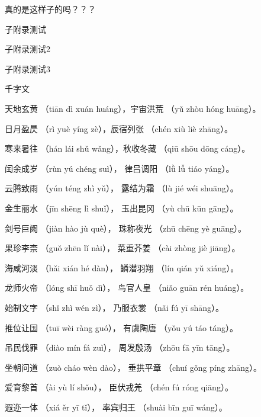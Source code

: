 \documentclass[12pt]{article}%
\begin{document}
\newpage
\begin{appendices}
真的是这样子的吗？？？
\begin{subappendix}
子附录测试





\end{subappendix}

\begin{subappendix}
子附录测试2
\end{subappendix}

\begin{subappendix}
子附录测试3

\centerline{\sihao\color{red}千字文}
\begin{center}
天地玄黄 （tiān dì xuán huáng），宇宙洪荒 （yǔ zhòu hóng huāng）。

日月盈昃 （rì yuè yíng zè），辰宿列张 （chén xiù liè zhāng）。

寒来暑往 （hán lái shǔ wǎng），秋收冬藏 （qiū shōu dōng cáng）。

闰余成岁 （rùn yú chéng suì）， 律吕调阳 （lǜ lǚ tiáo yáng）。

云腾致雨 （yún téng zhì yǔ）， 露结为霜 （lù jié wéi shuāng）。

金生丽水 （jīn shēng lì shuǐ）， 玉出昆冈 （yù chū kūn gāng）。

剑号巨阙 （jiàn hào jù què）， 珠称夜光 （zhū chēng yè guāng）。

果珍李柰 （guǒ zhēn lǐ nài）， 菜重芥姜 （cài zhòng jiè jiāng）。

海咸河淡 （hǎi xián hé dàn）， 鳞潜羽翔 （lín qián yǔ xiáng）。

龙师火帝 （lóng shī huǒ dì）， 鸟官人皇 （niǎo guān rén huáng）。

始制文字 （shǐ zhì wén zì）， 乃服衣裳 （nǎi fú yī shāng）。

推位让国 （tuī wèi ràng guó）， 有虞陶唐 （yǒu yú táo táng）。

吊民伐罪 （diào mín fá zuì）， 周发殷汤 （zhōu fā yīn tāng）。

坐朝问道 （zuò cháo wèn dào）， 垂拱平章 （chuí gǒng píng zhāng）。

爱育黎首 （ài yù lí shǒu）， 臣伏戎羌 （chén fú róng qiāng）。

遐迩一体 （xiá ěr yī tǐ）， 率宾归王 （shuài bīn guī wáng）。


\end{center}
\end{subappendix}
\end{appendices}
\end{document}
